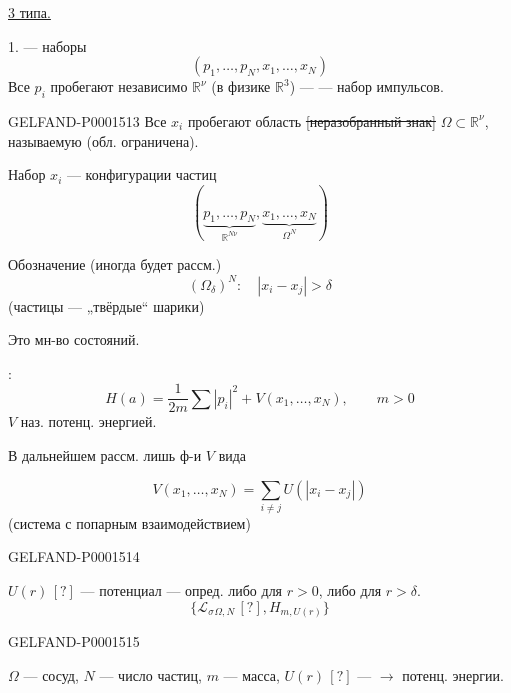 \underline{3 типа.}

1.  — наборы
\begin{equation*}
(p_1,\ldots,p_N,x_1,\ldots,x_N)
\end{equation*}
Все $p_i$ пробегают независимо $\mathbb R^\nu$ (в физике $\mathbb R^3$) —
— набор импульсов.

\begin{GelfandAdjacentEvidence}{GELFAND-P000151}{3}
Все $x_i$ пробегают область \sout{[неразобранный знак]}
$\Omega\subset\mathbb R^\nu$, называемую  (обл. ограничена).
\end{GelfandAdjacentEvidence}

Набор $x_i$ — конфигурации частиц
\begin{equation*}
(\underbrace{p_1,\ldots,p_N}_{\mathbb R^{N\nu}},\underbrace{x_1,\ldots,x_N}_{\Omega^N})
\end{equation*}


Обозначение (иногда будет рассм.)
\begin{equation*}
(\Omega_\delta)^N:\quad |x_i-x_j|>\delta
\end{equation*}
(частицы — „твёрдые“ шарики)

Это мн-во состояний.


:
\begin{equation*}
H(a)=\frac1{2m}\sum|p_i|^2+V(x_1,\ldots,x_N),\qquad m>0
\end{equation*}
$V$ наз. потенц. энергией.

В дальнейшем рассм. лишь ф-и $V$ вида

\begin{equation*}
V(x_1,\ldots,x_N)=\sum_{i\ne j}U(|x_i-x_j|)
\end{equation*}
(система с попарным взаимодействием)

\begin{GelfandAdjacentEvidence}{GELFAND-P000151}{4}

$U(r)\,[?]$ — потенциал — опред. либо для $r>0$, либо
для $r>\delta$.
\begin{equation*}
\{\mathcal L_\sigma{}_{\Omega,N}\,[?],H_{m,U(r)}\}
\end{equation*}
\end{GelfandAdjacentEvidence}
\begin{GelfandAdjacentEvidence}{GELFAND-P000151}{5}

$\Omega$ — сосуд, $N$ — число частиц, $m$ — масса, $U(r)\,[?]$ —
$\longrightarrow$ потенц. энергии.
\end{GelfandAdjacentEvidence}



